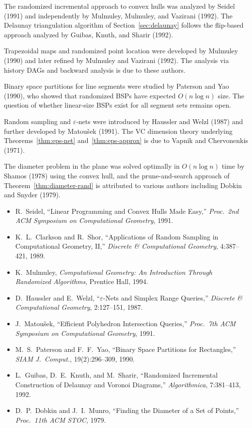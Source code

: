 \documentclass[twoside,12pt]{book}
\theoremstyle{plain}
\theoremstyle{definition}
\theoremstyle{remark}
\begin{document}
The randomized incremental approach to convex hulls was analyzed by Seidel (1991) and independently by Mulmuley, Mulmuley, and Vazirani (1992). The Delaunay triangulation algorithm of Section~\ref{sec:delaunay} follows the flip-based approach analyzed by Guibas, Knuth, and Sharir (1992).

Trapezoidal maps and randomized point location were developed by Mulmuley (1990) and later refined by Mulmuley and Vazirani (1992). The analysis via history DAGs and backward analysis is due to these authors.

Binary space partitions for line segments were studied by Paterson and Yao (1990), who showed that randomized BSPs have expected $O(n \log n)$ size. The question of whether linear-size BSPs exist for all segment sets remains open.

Random sampling and $\varepsilon$-nets were introduced by Haussler and Welzl (1987) and further developed by Matou\v{s}ek (1991). The VC dimension theory underlying Theorems~\ref{thm:eps-net} and~\ref{thm:eps-approx} is due to Vapnik and Chervonenkis (1971).

The diameter problem in the plane was solved optimally in $O(n \log n)$ time by Shamos (1978) using the convex hull, and the prune-and-search approach of Theorem~\ref{thm:diameter-rand} is attributed to various authors including Dobkin and Snyder (1979).

\begin{itemize}[nosep]
    \item R.~Seidel, ``Linear Programming and Convex Hulls Made Easy,'' \textit{Proc.\ 2nd ACM Symposium on Computational Geometry}, 1991.
    \item K.~L.~Clarkson and R.~Shor, ``Applications of Random Sampling in Computational Geometry, II,'' \textit{Discrete \& Computational Geometry}, 4:387--421, 1989.
    \item K.~Mulmuley, \textit{Computational Geometry: An Introduction Through Randomized Algorithms}, Prentice Hall, 1994.
    \item D.~Haussler and E.~Welzl, ``$\varepsilon$-Nets and Simplex Range Queries,'' \textit{Discrete \& Computational Geometry}, 2:127--151, 1987.
    \item J.~Matou\v{s}ek, ``Efficient Polyhedron Intersection Queries,'' \textit{Proc.\ 7th ACM Symposium on Computational Geometry}, 1991.
    \item M.~S.~Paterson and F.~F.~Yao, ``Binary Space Partitions for Rectangles,'' \textit{SIAM J.\ Comput.}, 19(2):296--309, 1990.
    \item L.~Guibas, D.~E.~Knuth, and M.~Sharir, ``Randomized Incremental Construction of Delaunay and Voronoi Diagrams,'' \textit{Algorithmica}, 7:381--413, 1992.
    \item D.~P.~Dobkin and J.~I.~Munro, ``Finding the Diameter of a Set of Points,'' \textit{Proc.\ 11th ACM STOC}, 1979.
\end{itemize}
\end{document}
